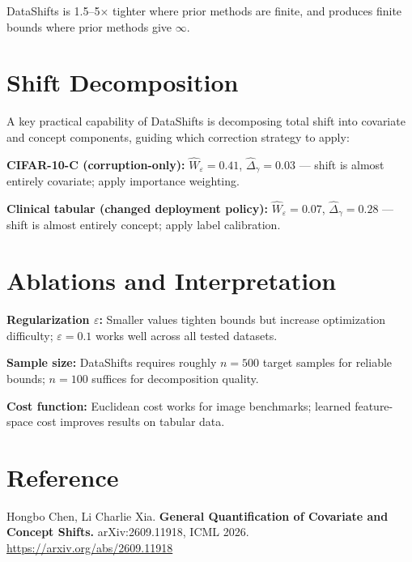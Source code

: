 \documentclass[10pt,twocolumn]{article}
\begin{document}
DataShifts is 1.5--5$\times$ tighter where prior methods are finite,
and produces finite bounds where prior methods give $\infty$.

\section{Shift Decomposition}

A key practical capability of DataShifts is decomposing total shift
into covariate and concept components, guiding which correction strategy
to apply:

\textbf{CIFAR-10-C (corruption-only):}
$\hat{W}_\varepsilon = 0.41$, $\hat{\Delta}_\gamma = 0.03$ ---
shift is almost entirely covariate; apply importance weighting.

\textbf{Clinical tabular (changed deployment policy):}
$\hat{W}_\varepsilon = 0.07$, $\hat{\Delta}_\gamma = 0.28$ ---
shift is almost entirely concept; apply label calibration.

\section{Ablations and Interpretation}

\textbf{Regularization $\varepsilon$:} Smaller values tighten bounds
but increase optimization difficulty; $\varepsilon = 0.1$ works well
across all tested datasets.

\textbf{Sample size:} DataShifts requires roughly $n = 500$ target
samples for reliable bounds; $n = 100$ suffices for decomposition
quality.

\textbf{Cost function:} Euclidean cost works for image benchmarks;
learned feature-space cost improves results on tabular data.

\section*{Reference}

Hongbo Chen, Li Charlie Xia.
\textbf{General Quantification of Covariate and Concept Shifts.}
arXiv:2609.11918, ICML 2026.
\url{https://arxiv.org/abs/2609.11918}
\end{document}
